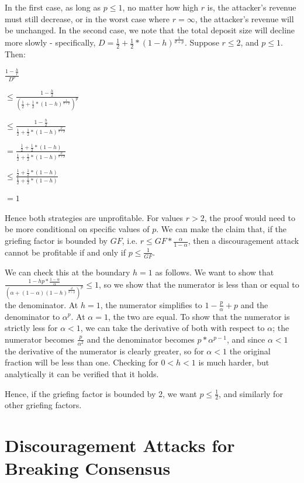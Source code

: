 \documentclass[12pt]{article}
\begin{document}
In the first case, as long as $p \le 1$, no matter how high $r$ is, the attacker's revenue must still decrease, or in the worst case where $r = \infty$, the attacker's revenue will be unchanged. In the second case, we note that the total deposit size will decline more slowly - specifically, $D = \frac{1}{2} + \frac{1}{2} * (1-h)^{\frac{1}{d+p}}$. Suppose $r \le 2$, and $p \le 1$. Then:

$\frac{1-\frac{h}{r}}{D^p}$

$ \le \frac{1-\frac{h}{2}}{(\frac{1}{2} + \frac{1}{2} * (1-h)^{\frac{1}{d+p}})^p}$

$ \le \frac{1-\frac{h}{2}}{\frac{1}{2} + \frac{1}{2} * (1-h)^{\frac{p}{d+p}}}$

$ = \frac{\frac{1}{2} + \frac{1}{2} * (1-h)}{\frac{1}{2} + \frac{1}{2} * (1-h)^{\frac{p}{d+p}}}$

$ \le \frac{\frac{1}{2} + \frac{1}{2} * (1-h)}{\frac{1}{2} + \frac{1}{2} * (1-h)}$

$ = 1$

Hence both strategies are unprofitable. For values $r > 2$, the proof would need to be more conditional on specific values of $p$. We can make the claim that, if the griefing factor is bounded by $GF$, i.e. $r \le GF * \frac{\alpha}{1-\alpha}$, then a discouragement attack cannot be profitable if and only if $p \le \frac{1}{GF}$.

We can check this at the boundary $h = 1$ as follows. We want to show that $\frac{1 - hp * \frac{1-\alpha}{\alpha}}{(\alpha + (1-\alpha)(1-h)^{\frac{d}{d+p}})^p} \le 1$, so we show that the numerator is less than or equal to the denominator. At $h = 1$, the numerator simplifies to $1 - \frac{p}{\alpha} + p$ and the denominator to $\alpha^p$. At $\alpha=1$, the two are equal. To show that the numerator is strictly less for $\alpha<1$, we can take the derivative of both with respect to $\alpha$; the numerator becomes $\frac{p}{\alpha^2}$ and the denominator becomes $p * \alpha^{p-1}$, and since $\alpha < 1$ the derivative of the numerator is clearly greater, so for $\alpha < 1$ the original fraction will be less than one. Checking for $0 < h < 1$ is much harder, but analytically it can be verified that it holds.

Hence, if the griefing factor is bounded by 2, we want $p \le \frac{1}{2}$, and similarly for other griefing factors.


\section{Discouragement Attacks for Breaking Consensus}
\end{document}
